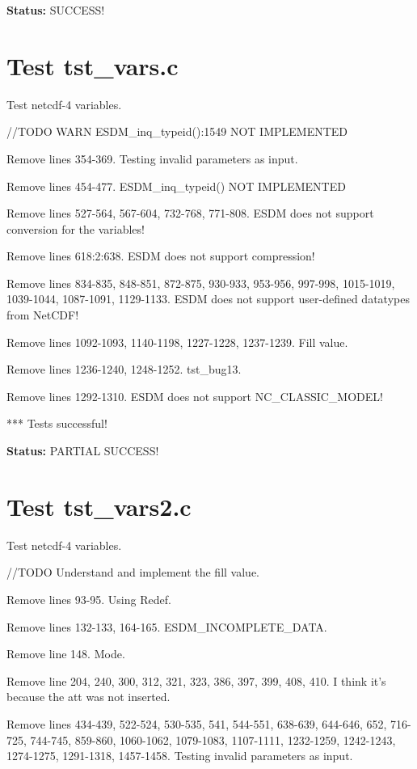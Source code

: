 {\bf \large Status: } SUCCESS!

\section{Test tst\_vars.c}

Test netcdf-4 variables.

//TODO WARN ESDM\_inq\_typeid():1549 NOT IMPLEMENTED

Remove lines 354-369. Testing invalid parameters as input.

Remove lines 454-477. ESDM\_inq\_typeid() NOT IMPLEMENTED

Remove lines 527-564, 567-604, 732-768, 771-808. ESDM does not support conversion for the variables!

Remove lines 618:2:638. ESDM does not support compression!

Remove lines 834-835, 848-851, 872-875, 930-933, 953-956, 997-998, 1015-1019, 1039-1044, 1087-1091, 1129-1133. ESDM does not support user-defined datatypes from NetCDF!

Remove lines 1092-1093, 1140-1198, 1227-1228, 1237-1239. Fill value.

Remove lines 1236-1240, 1248-1252. tst\_bug13.

Remove lines 1292-1310. ESDM does not support NC\_CLASSIC\_MODEL!

*** Tests successful!

{\bf \large Status: } PARTIAL SUCCESS!

\section{Test tst\_vars2.c}

Test netcdf-4 variables.

//TODO Understand and implement the fill value.

Remove lines 93-95. Using Redef.

Remove lines 132-133, 164-165. ESDM\_INCOMPLETE\_DATA.

Remove line 148. Mode.

Remove line 204, 240, 300, 312, 321, 323, 386, 397, 399, 408, 410. I think it's because the att was not inserted.

Remove lines 434-439, 522-524, 530-535, 541, 544-551, 638-639, 644-646, 652, 716-725, 744-745, 859-860, 1060-1062, 1079-1083, 1107-1111, 1232-1259, 1242-1243, 1274-1275, 1291-1318, 1457-1458. Testing invalid parameters as input.

